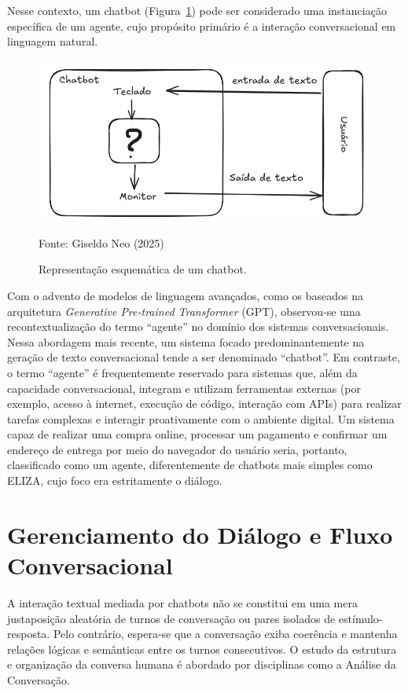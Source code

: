 \documentclass[a4paper,oneside]{book}
\begin{document}
Nesse contexto, um chatbot (Figura~\ref{fig:chatbot}) pode ser considerado uma instanciação específica de um agente, cujo propósito primário é a interação conversacional em linguagem natural.

\begin{figure}
	\centering
	\caption{Representação esquemática de um chatbot.}
	\includegraphics[width=0.9\linewidth]{fig/chatbot.png}
	\label{fig:chatbot}
	{\footnotesize \centering

		Fonte: Giseldo Neo (2025)}
\end{figure}

Com o advento de modelos de linguagem avançados, como os baseados na arquitetura \textit{Generative Pre-trained Transformer} (GPT), observou-se uma recontextualização do termo ``agente'' no domínio dos sistemas conversacionais. Nessa abordagem mais recente, um sistema focado predominantemente na geração de texto conversacional tende a ser denominado ``chatbot''. Em contraste, o termo ``agente'' é frequentemente reservado para sistemas que, além da capacidade conversacional, integram e utilizam ferramentas externas (por exemplo, acesso à internet, execução de código, interação com APIs) para realizar tarefas complexas e interagir proativamente com o ambiente digital. Um sistema capaz de realizar uma compra online, processar um pagamento e confirmar um endereço de entrega por meio do navegador do usuário seria, portanto, classificado como um agente, diferentemente de chatbots mais simples como ELIZA, cujo foco era estritamente o diálogo.


\section{Gerenciamento do Diálogo e Fluxo Conversacional}

A interação textual mediada por chatbots não se constitui em uma mera justaposição aleatória de turnos de conversação ou pares isolados de estímulo-resposta. Pelo contrário, espera-se que a conversação exiba coerência e mantenha relações lógicas e semânticas entre os turnos consecutivos. O estudo da estrutura e organização da conversa humana é abordado por disciplinas como a Análise da Conversação.
\end{document}

